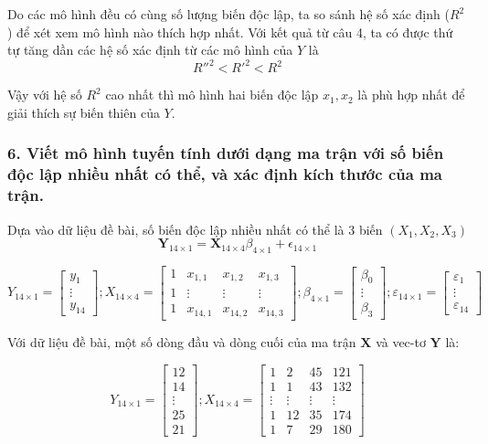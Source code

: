 \documentclass[a4paper]{article}
\theoremstyle{nonumberplain}
\begin{document}
Do các mô hình đều có cùng số lượng biến độc lập, ta so sánh hệ số xác định ($R^2$) để xét xem mô hình nào thích hợp nhất. Với kết quả từ câu 4, ta có được thứ tự tăng dần các hệ số xác định từ các mô hình của $Y$ là \[R''^2 < R'^2 < R^2 \]

Vậy với hệ số $R^2$ cao nhất thì mô hình hai biến độc lập $x_1, x_2$ là phù hợp nhất để giải thích sự biến thiên của $Y$.

\subsubsection*{6. Viết mô hình tuyến tính dưới dạng ma trận với số biến độc lập nhiều nhất có thể, và xác định kích thước của ma trận.}
Dựa vào dữ liệu đề bài, số biến độc lập nhiều nhất có thể là 3 biến $(X_1,X_2,X_3)$
$$\mathbf{Y}_{14\times1} = \mathbf{X}_{14\times4}\beta_{4\times1} + \epsilon_{14\times1}$$

\[{Y_{14 \times 1}} = \left[ {\begin{array}{*{20}{c}}
  {{y_1}} \\ 
   \vdots  \\ 
  {{y_{14}}} 
\end{array}} \right];{X_{14 \times 4}} = \left[ {\begin{array}{*{20}{c}}
  1&{{x_{1,1}}}&{{x_{1,2}}}&{{x_{1,3}}} \\ 
  1& \vdots & \vdots & \vdots  \\ 
  1&{{x_{14,1}}}&{{x_{14,2}}}&{{x_{14,3}}} 
\end{array}} \right];{\beta _{4 \times 1}} = \left[ {\begin{array}{*{20}{c}}
  {{\beta _0}} \\ 
   \vdots  \\ 
  {{\beta _3}} 
\end{array}} \right];{\varepsilon _{14 \times 1}} = \left[ {\begin{array}{*{20}{c}}
  {{\varepsilon _1}} \\ 
   \vdots  \\ 
  {{\varepsilon _{14}}} 
\end{array}} \right]\]

Với dữ liệu đề bài, một số dòng đầu và dòng cuối của ma trận $\mathbf{X}$ và vec-tơ $\mathbf{Y}$ là:

\[{Y_{14 \times 1}} = \left[ {\begin{array}{*{20}{c}}
  {{12}} \\
  {{14}}  \\
   \vdots  \\ 
  {{25}} \\
  {{21}}
\end{array}} \right];{X_{14 \times 4}} = \left[ {\begin{array}{*{20}{c}}
  1&{{2}}&{{45}}&{{121}} \\ 
  1&{{1}}&{{43}}&{{132}} \\ 
  \vdots & \vdots & \vdots & \vdots  \\ 
  1&{{12}}&{{35}}&{{174}} \\ 
  1&{{7}}&{{29}}&{{180}} 
\end{array}} \right]\]
\end{document}
